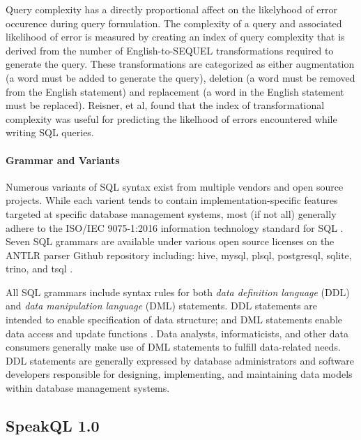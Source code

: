 Query complexity has a directly proportional affect on the likelyhood of error occurence during query formulation. The complexity of a query and associated likelihood of error is measured by creating an index of query complexity that is derived from the number of English-to-SEQUEL transformations required to generate the query. These transformations are categorized as either augmentation (a word must be added to generate the query), deletion (a word must be removed from the English statement) and replacement (a word in the English statement must be replaced). \cite{Reisner1975} Reisner, et al, found that the index of transformational complexity was useful for predicting the likelhood of errors encountered while writing SQL queries.

\paragraph{Grammar and Variants}

Numerous variants of SQL syntax exist from multiple vendors and open source projects. While each varient tends to contain implementation-specific features targeted at specific database management systems, most (if not all) generally adhere to the ISO/IEC 9075-1:2016 information technology standard for SQL \cite{kelechava_2020}. Seven SQL grammars are available under various open source licenses on the ANTLR parser Github repository including: hive, mysql, plsql, postgresql, sqlite, trino, and tsql \cite{antlrgrammarsv4}.

All SQL grammars include syntax rules for both \emph{data definition language} (DDL) and \emph{data manipulation language} (DML) statements. DDL statements are intended to enable specification of data structure; and DML statements enable data access and update functions \cite{DBLP:books/aw/AbiteboulHV95}. Data analysts, informaticists, and other data consumers generally make use of DML statements to fulfill data-related needs. DDL statements are generally expressed by database administrators and software developers responsible for designing, implementing, and maintaining data models within database management systems. 


\subsection{SpeakQL 1.0}

